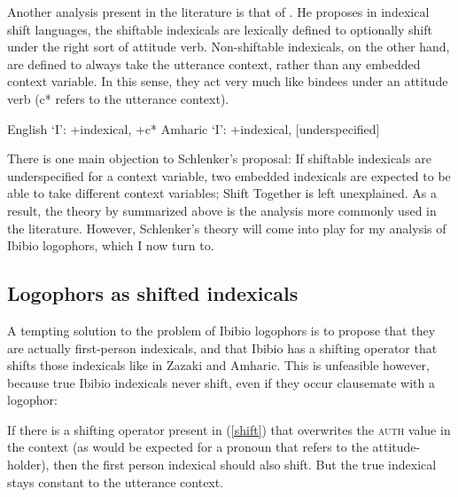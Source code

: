 \documentclass[output=paper]{langscibook}
\begin{document}
Another analysis present in the literature is that of \citet{Schlenker2003}. He proposes in indexical shift languages, the shiftable indexicals are lexically defined to optionally shift under the right sort of attitude verb. Non-shiftable indexicals, on the other hand, are defined to always take the utterance context, rather than any embedded context variable. In this sense, they act very much like bindees under an attitude verb (c\** refers to the utterance context).
\begin{exe}
	\ex \begin{xlist}
		\ex English `I': +indexical, +c\**
		\ex Amharic `I': +indexical, [underspecified]
	\end{xlist}
\end{exe}
There is one main objection to Schlenker's proposal: If shiftable indexicals are underspecified for a context variable, two embedded indexicals are expected to be able to take different context variables; Shift Together is left unexplained. As a result, the theory by \citet{Anand2006} summarized above is the analysis more commonly used in the literature. However, Schlenker's theory will come into play for my analysis of Ibibio logophors, which I now turn to.



\subsection{Logophors as shifted indexicals}

A tempting solution to the problem of Ibibio logophors is to propose that they are actually first-person indexicals, and that Ibibio has a shifting operator that shifts those indexicals like in Zazaki and Amharic. This is unfeasible however, because true Ibibio indexicals never shift, even if they occur clausemate with a logophor:
\begin{exe}
	\label{shift}
\end{exe}
If there is a shifting operator present in (\ref{shift}) that overwrites the \textsc{auth} value in the context (as would be expected for a pronoun that refers to the attitude-holder), then the first person indexical should also shift. But the true indexical stays constant to the utterance context.
\end{document}
